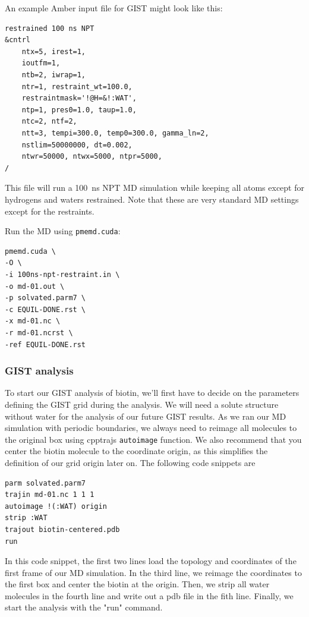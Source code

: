 \documentclass[9pt,tutorial]{livecoms}
\newcommand{\software}{\texttt}
\newcommand\inlinecode{\texttt}
\begin{document}
An example Amber input file for GIST might look like this:
\begin{lstlisting}[style=amber-in]
restrained 100 ns NPT
&cntrl
	ntx=5, irest=1,
	ioutfm=1,
	ntb=2, iwrap=1,
	ntr=1, restraint_wt=100.0,
	restraintmask='!@H=&!:WAT',
	ntp=1, pres0=1.0, taup=1.0,
	ntc=2, ntf=2,
	ntt=3, tempi=300.0, temp0=300.0, gamma_ln=2,
	nstlim=50000000, dt=0.002,
	ntwr=50000, ntwx=5000, ntpr=5000,
/
\end{lstlisting}

This file will run a \SI{100}{\nano\second} NPT MD simulation while keeping all atoms except for hydrogens and waters restrained.
Note that these are very standard MD settings except for the restraints.

Run the MD using \software{pmemd.cuda}:
\begin{lstlisting}[style=bash]
pmemd.cuda \
-O \
-i 100ns-npt-restraint.in \
-o md-01.out \
-p solvated.parm7 \
-c EQUIL-DONE.rst \
-x md-01.nc \
-r md-01.ncrst \
-ref EQUIL-DONE.rst
\end{lstlisting}
\subsubsection{GIST analysis}
To start our GIST analysis of biotin, we'll first have to decide on the parameters defining the GIST grid during the analysis.
We will need a solute structure without water for the analysis of our future GIST results. As we ran our MD simulation with periodic boundaries, we always need to reimage all molecules to the original box using cpptrajs \inlinecode{autoimage} function. We also recommend that you center the biotin molecule to the coordinate origin, as this simplifies the definition of our grid origin later on. The following code snippets are 
\begin{lstlisting}[style=cpptraj]
parm solvated.parm7 
trajin md-01.nc 1 1 1 
autoimage !(:WAT) origin 
strip :WAT 
trajout biotin-centered.pdb 
run
\end{lstlisting}
In this code snippet, the first two lines load the topology and coordinates of the first frame of our MD simulation. In the third line, we reimage the coordinates to the first box and center the biotin at the origin. Then, we strip all water molecules in the fourth line and write out a pdb file in the fith line. Finally, we start the analysis with the "run" command.
\end{document}
